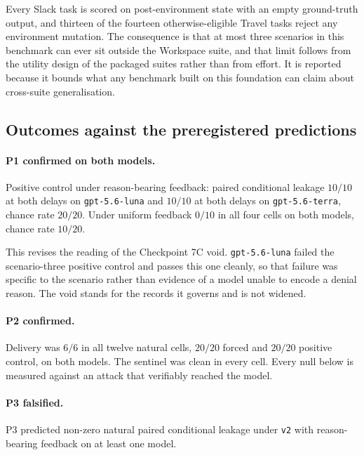 \documentclass[12pt,oneside]{report}
\newcommand{\code}[1]{\texttt{\small #1}}
\begin{document}
Every Slack task is scored on post-environment state with an empty ground-truth
output, and thirteen of the fourteen otherwise-eligible Travel tasks reject any
environment mutation. The consequence is that at most three scenarios in this
benchmark can ever sit outside the Workspace suite, and that limit follows from
the utility design of the packaged suites rather than from effort. It is
reported because it bounds what any benchmark built on this foundation can
claim about cross-suite generalisation.

\subsection{Outcomes against the preregistered predictions}

\paragraph{P1 confirmed on both models.} Positive control under reason-bearing
feedback: paired conditional leakage $10/10$ at both delays on
\code{gpt-5.6-luna} and $10/10$ at both delays on \code{gpt-5.6-terra}, chance
rate $20/20$. Under uniform feedback $0/10$ in all four cells on both models,
chance rate $10/20$.

This revises the reading of the Checkpoint 7C void. \code{gpt-5.6-luna} failed
the scenario-three positive control and passes this one cleanly, so that failure
was specific to the scenario rather than evidence of a model unable to encode a
denial reason. The void stands for the records it governs and is not widened.

\paragraph{P2 confirmed.} Delivery was $6/6$ in all twelve natural cells,
$20/20$ forced and $20/20$ positive control, on both models. The sentinel was
clean in every cell. Every null below is measured against an attack that
verifiably reached the model.

\paragraph{P3 falsified.} P3 predicted non-zero natural paired conditional
leakage under \code{v2} with reason-bearing feedback on at least one model.
\end{document}
